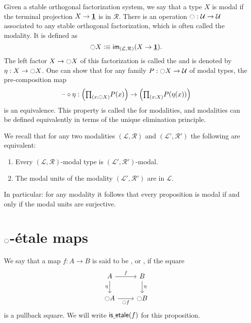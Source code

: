\documentclass[9pt,twosided]{amsart}
\begin{document}
Given a stable orthogonal factorization system, we say that a type $X$ is modal if the terminal projection $X\to \underline{\mathbf{1}}$ is in $\mathcal{R}$. 
There is an operation ${\ocircle}:\mathcal{U}\to\mathcal{U}$ associated to any stable orthogonal factorization, which is often called the modality. It is defined as
\begin{equation*}
{\ensuremath{\ocircle}} X \vcentcolon\equiv \mathsf{im}_{(\mathcal{L},\mathcal{R})}(X\to \underline{\mathbf{1}}).
\end{equation*}
The left factor $X \to {\ensuremath{\ocircle}} X$ of this factorization is called the  and is denoted by $\eta:X\to {\ensuremath{\ocircle}} X$. One can show that for any family $P:{\ocircle} X \to \mathcal{U}$ of modal types, the pre-composition map
\begin{equation*}
\blank\circ \eta : \Big(\prd{x:\modal X}P(x)\Big)\to \Big(\prd{x:X}P(\eta(x))\Big)
\end{equation*}
is an equivalence. This property is called the  for modalities, and modalities can be defined equivalently in terms of the unique elimination principle.

We recall that for any two modalities $(\mathcal{L},\mathcal{R})$ and $(\mathcal{L}',\mathcal{R}')$ the following are equivalent:
\begin{enumerate}
\item Every $(\mathcal{L},\mathcal{R})$-modal type is $(\mathcal{L}',\mathcal{R}')$-modal.
\item The modal units of the modality $(\mathcal{L}',\mathcal{R}')$ are in $\mathcal{L}$.
\end{enumerate}
In particular: for any modality it follows that every proposition is modal if and only if the modal units are surjective.

\section{\texorpdfstring{${\ocircle}$}{○}-\'etale maps}

\begin{defn}
We say that a map $f:A\to B$ is said to be , or , if the square
\begin{equation*}
\begin{tikzcd}
A \arrow[r,"f"] \arrow[d,swap,"\eta"] & B \arrow[d,"\eta"] \\
\modal A \arrow[r,swap,"\modal f"] & \modal B
\end{tikzcd}
\end{equation*}
is a pullback square. We will write $\mathsf{is\underline{\ }{}etale}(f)$ for this proposition.
\end{defn}
\end{document}
